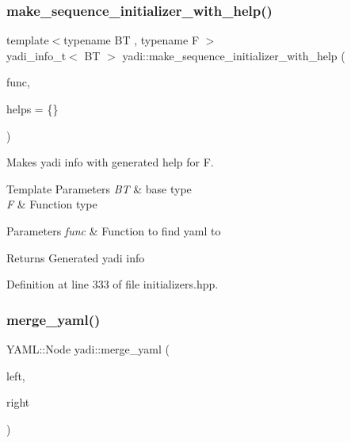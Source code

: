 \mbox{\label{namespaceyadi_aba056e293eb266e6ae286c6480ebe667}} 
\subsubsection{\texorpdfstring{make\+\_\+sequence\+\_\+initializer\+\_\+with\+\_\+help()}{make\_sequence\_initializer\_with\_help()}}
{\footnotesize\ttfamily template$<$typename BT , typename F $>$ \\
yadi\+\_\+info\+\_\+t$<$ BT $>$ yadi\+::make\+\_\+sequence\+\_\+initializer\+\_\+with\+\_\+help (\begin{DoxyParamCaption}\item[{F}]{func,  }\item[{std\+::vector$<$ std\+::string $>$}]{helps = {\ttfamily \{\}} }\end{DoxyParamCaption})}



Makes yadi info with generated help for F. 


\begin{DoxyTemplParams}{Template Parameters}
{\em BT} & base type \\
\hline
{\em F} & Function type \\
\hline
\end{DoxyTemplParams}

\begin{DoxyParams}{Parameters}
{\em func} & Function to find yaml to \\
\hline
\end{DoxyParams}
\begin{DoxyReturn}{Returns}
Generated yadi info 
\end{DoxyReturn}


Definition at line 333 of file initializers.\+hpp.

\mbox{\label{namespaceyadi_a495ab0c09cfb0aba37fd2115350d81d9}} 
\subsubsection{\texorpdfstring{merge\+\_\+yaml()}{merge\_yaml()}}
{\footnotesize\ttfamily Y\+A\+M\+L\+::\+Node yadi\+::merge\+\_\+yaml (\begin{DoxyParamCaption}\item[{Y\+A\+M\+L\+::\+Node const \&}]{left,  }\item[{Y\+A\+M\+L\+::\+Node const \&}]{right }\end{DoxyParamCaption})}

